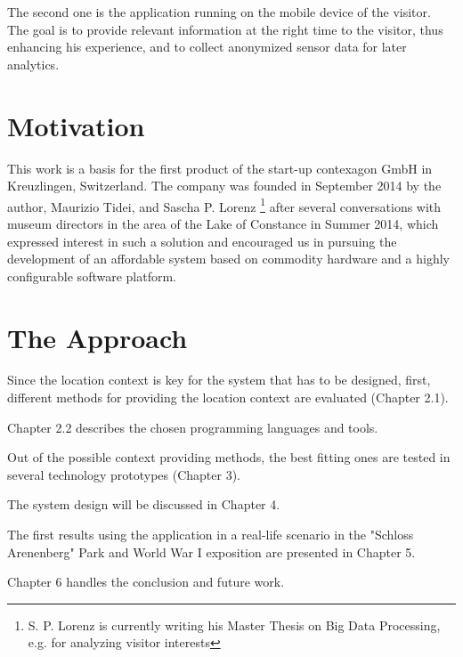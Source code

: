 The second one is the application running on the mobile device of the visitor. The goal is to provide relevant information at the right time to the visitor, thus enhancing his experience, and to collect anonymized sensor data for later analytics.

\section{Motivation}

This work is a basis for the first product of the start-up contexagon GmbH in Kreuzlingen, Switzerland. The company was founded in September 2014 by the author, Maurizio Tidei, and Sascha P. Lorenz \footnote{S. P. Lorenz is currently writing his Master Thesis on Big Data Processing, e.g. for analyzing visitor interests} after several conversations with museum directors in the area of the Lake of Constance in Summer 2014, which expressed interest in such a solution and encouraged us in pursuing the development of an affordable system based on commodity hardware and a highly configurable software platform.

\section{The Approach}

Since the location context is key for the system that has to be designed, first, different methods for providing the location context are evaluated (Chapter 2.1). 

Chapter 2.2 describes the chosen programming languages and tools.

Out of the possible context providing methods, the best fitting ones are tested in several technology prototypes (Chapter 3).

The system design will be discussed in Chapter 4.

The first results using the application in a real-life scenario in the "Schloss Arenenberg" Park and World War I exposition are presented in Chapter 5.

Chapter 6 handles the conclusion and future work. 